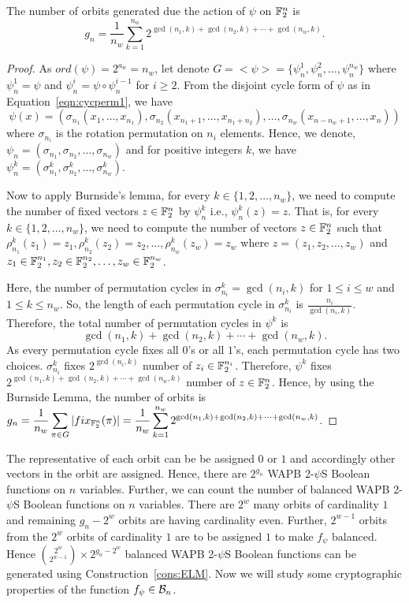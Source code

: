 \documentclass{llncs}
\begin{document}
\begin{theorem}
The number of orbits generated due the action of $\psi$ on $\mathbb{F}_2^n$ is
$$g_n= \frac{1}{n_w} \sum_{k=1}^{n_w}  2^{\gcd(n_1,k)+ \gcd(n_2,k) + \cdots + \gcd(n_w,k)}.$$
\end{theorem}
\begin{proof}
As $ord(\psi) = 2^{a_w} = n_w$, let denote $G = <\psi> = \{\psi_n^1,\psi_n^2, \ldots, \psi_n^{n_w}\}$ where $\psi_n^1 = \psi$ and $\psi_n^i = \psi \circ \psi_n^{i-1}$ for $i \geq 2$. From the disjoint cycle form of $\psi$ as in Equation~\ref{eqn:cycperm1}, we have 
$$\psi(x) = (\sigma_{n_1}(x_1,\ldots,x_{n_1}), \sigma_{n_2}(x_{n_1+1},\ldots,x_{n_1+n_2}), \ldots, \sigma_{n_w}(x_{n-n_w+1},\ldots,x_n))$$
where $\sigma_{n_i}$ is the rotation permutation on $n_i$ elements.
Hence, we denote, $\psi_n = (\sigma_{n_1},\sigma_{n_2},\ldots,\sigma_{n_w})$ and for positive integers $k$, we have $\psi_n^k = (\sigma_{n_1}^k,\sigma_{n_2}^k,\ldots,\sigma_{n_w}^k)$.

Now to apply Burnside's lemma, for every $k \in \{1, 2, \ldots, n_w\}$, we need to compute the number of fixed vectors $z \in \mathbb{F}_2^n$ by $\psi_n^k$ i.e., $\psi_n^k(z) = z$. That is, for every $k \in \{1, 2, \ldots, n_w\}$, we need to compute the number of vectors $z \in \mathbb{F}_2^n$ such that $\rho_{n_1}^k(z_1) = z_1, \rho_{n_2}^k(z_2) = z_2, \ldots, \rho_{n_w}^k(z_w) = z_w$ where $z = (z_1,z_2, \ldots, z_w)$ and $z_1 \in \mathbb{F}_2^{n_1}, z_2 \in \mathbb{F}_2^{n_2}, \ldots, z_w \in \mathbb{F}_2^{n_w}$.

Here, the number of permutation cycles in $\sigma_{n_i}^k= \gcd(n_i,k)$ for $1 \leq i \leq w$ and $1 \leq k \leq n_w$. So, the length of each permutation cycle in $\sigma_{n_i}^k$ is $\frac{n_i}{\gcd(n_i,k)}$. 
Therefore, the total number of permutation cycles in $\psi^k$ is $$\gcd(n_1,k)+ \gcd(n_2,k) + \cdots + \gcd(n_w,k).$$
As every permutation cycle fixes all $0$'s or all $1$'s, each permutation cycle has two choices.
$\sigma_{n_i}^k$ fixes $2^{\gcd(n_i,k)}$ number of $z_i \in \mathbb{F}_2^{n_i}$. Therefore, $\psi^k$ fixes $2^{\gcd(n_1,k)+ \gcd(n_2,k) + \cdots + \gcd(n_w,k)}$ number of $z \in \mathbb{F}_2^n$. Hence, by using the Burnside Lemma, the number of orbits is\\
$\displaystyle{g_n = \frac{1}{n_w} \sum_{\pi \in G} |fix_{\mathbb{F}_2^n}(\pi)| 
    = \frac{1}{n_w} \sum_{k=1}^{n_w}  2^{\gcd(n_1,k)+ \gcd(n_2,k) + \cdots + \gcd(n_w,k)}}$.
\end{proof}
The representative of each orbit can be be assigned $0$ or $1$ and accordingly other vectors in the orbit are assigned. Hence, there are $2^{g_n}$ WAPB 2-$\psi$S Boolean functions on $n$ variables. Further, we can count the number of balanced WAPB 2-$\psi$S Boolean functions on $n$ variables. There are $2^w$ many orbits of cardinality $1$ and remaining $g_n - 2^w$ orbits are having cardinality even. 
Further, $2^{w-1}$ orbits from the $2^w$ orbits of cardinality $1$ are to be assigned $1$ to make $f_\psi$ balanced. Hence $\binom{2^w}{2^{w-1}}\times 2^{g_n - 2^w}$ balanced WAPB 2-$\psi$S Boolean functions can be generated using Construction~\ref{cons:ELM}.
Now we will study some cryptographic properties of the function $f_\psi \in \mathcal{B}_n$. 
\end{document}
